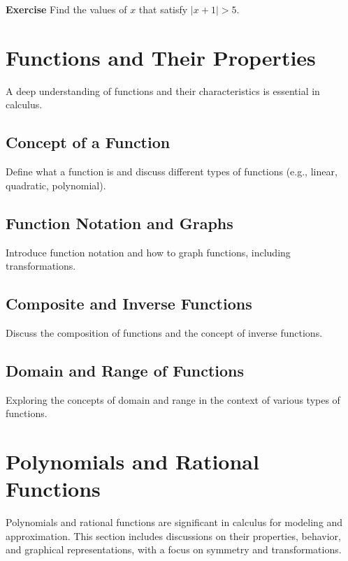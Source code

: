 \documentclass[a4paper,12pt]{book}
\newenvironment{exercise}[1][]
  {\par\medskip\noindent\textbf{Exercise #1} \rmfamily}
  {\medskip}
\begin{document}
\begin{exercise}
Find the values of \( x \) that satisfy \( |x + 1| > 5 \).
\end{exercise}



\section{Functions and Their Properties}
\label{sec:functions_and_properties}
A deep understanding of functions and their characteristics is essential in calculus.


\subsection{Concept of a Function}
\label{subsec:concept_of_function}
Define what a function is and discuss different types of functions (e.g., linear, quadratic, polynomial).


\subsection{Function Notation and Graphs}
\label{subsec:function_notation_and_graphs}
Introduce function notation and how to graph functions, including transformations.


\subsection{Composite and Inverse Functions}
\label{subsec:composite_and_inverse_functions}
Discuss the composition of functions and the concept of inverse functions.


\subsection{Domain and Range of Functions}
\label{subsec:domain_range_functions}
Exploring the concepts of domain and range in the context of various types of functions.


\section{Polynomials and Rational Functions}
\label{sec:polynomials_and_rational}
Polynomials and rational functions are significant in calculus for modeling and approximation. This section includes discussions on their properties, behavior, and graphical representations, with a focus on symmetry and transformations.
\end{document}
